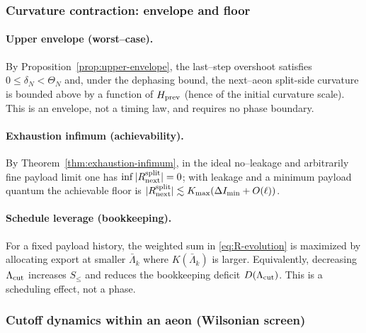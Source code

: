 \documentclass[10pt]{article}
\theoremstyle{definition}
\theoremstyle{plain}
\begin{document}
\subsubsection*{Curvature contraction: envelope and floor}
\label{subsubsec:geo-contract}

\paragraph{Upper envelope (worst--case).}\label{par:uom-main-153}
By Proposition~\ref{prop:upper-envelope}, the last--step overshoot satisfies
$0\le\delta_N<\Theta_N$ and, under the dephasing bound, the next--aeon split-side curvature is bounded above by
a function of $H_{\rm prev}$ (hence of the initial curvature scale). This is an envelope, not a timing law, and
requires no phase boundary.

\paragraph{Exhaustion infimum (achievability).}\label{par:uom-main-154}
By Theorem~\ref{thm:exhaustion-infimum}, in the ideal no--leakage and arbitrarily fine payload limit one has
$\inf |R_{\rm next}^{\rm split}|=0$; with leakage and a minimum payload quantum the achievable floor is
$|R_{\rm next}^{\rm split}|\lesssim K_{\max}(\Delta I_{\min}+O(\ell))$.

\paragraph{Schedule leverage (bookkeeping).}\label{par:uom-main-155}
For a fixed payload history, the weighted sum in \eqref{eq:R-evolution} is maximized by allocating export at
smaller $\bar\Lambda_k$ where $K(\bar\Lambda_k)$ is larger. Equivalently, decreasing $\Lambda_{\rm cut}$ increases
$S_{\le}$ and reduces the bookkeeping deficit $D(\Lambda_{\rm cut})$. This is a scheduling effect, not a phase.

\subsubsection*{Cutoff dynamics within an aeon (Wilsonian screen)}
\label{subsubsec:cutoff-dynamics-aeon}
\end{document}
